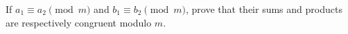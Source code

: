 If $a_1\equiv a_2\pmod m$ and $b_1\equiv b_2\pmod m$, prove that their sums and products are respectively congruent modulo $m$.
